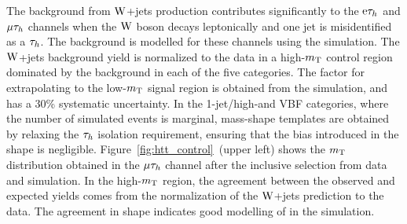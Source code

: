 \documentclass[12pt,twoside,a4paper,cmspaper,final,collab]{cms-tdr}
\begin{document}
The background from $\mathrm{W}$+jets production contributes significantly to the $\mathrm{e}\tau_h$ and ${\mu}\tau_h$ channels when the
$\mathrm{W}$ boson decays leptonically and one jet is misidentified as a $\tau_h$.
The background is modelled for these channels using the simulation.
The $\mathrm{W}$+jets background yield is normalized to the data in a high-$m_\mathrm{T}$
control region dominated by the background in each of the five categories.
The factor for extrapolating to the low-$m_\mathrm{T}$ signal region is obtained from the simulation,
and has a 30\% systematic uncertainty.
In the 1-jet/high-\pt and VBF categories, where the number of simulated events is marginal,
mass-shape templates are obtained by relaxing the $\tau_h$ isolation requirement,
ensuring that the bias introduced in the shape is negligible.
Figure~\ref{fig:htt_control}~(upper left) shows the $m_\mathrm{T}$ distribution obtained in the ${\mu}\tau_h$ channel after the inclusive selection from data and simulation.
In the high-$m_\mathrm{T}$ region, the agreement between the observed and expected yields comes from the normalization of the $\mathrm{W}$+jets prediction to the data.
The agreement in shape indicates good modelling of \MET in the simulation.
\end{document}
